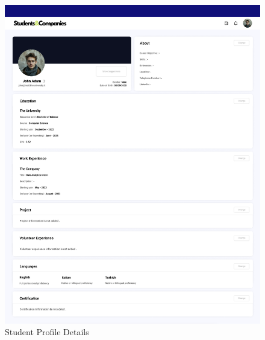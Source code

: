 \documentclass[a4paper,12pt]{article}
\begin{document}
\begin{figure}[H]
    \centering
    \includegraphics[scale = 0.35
    ]{figures/UserInterfaces/Student/Profile.png}
    \caption{Student Profile Details}
     \centering
\end{figure}
\end{document}
